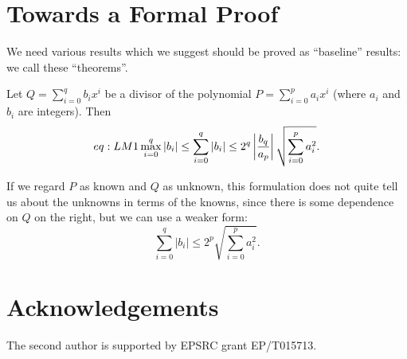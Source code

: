 \documentclass{llncs}
\begin{document}
\section{Towards a Formal Proof}
We need various results which we suggest should be proved as ``baseline'' results: we call these ``theorems''.
\begin{theorem}\label{thm:LM}
Let $Q = \sum_{i=0}^q{b_i x^i}$ be a divisor of the polynomial
$P=\sum_{i=0}^p{a_ix^i}$ (where $a_i$ and $b_i$ are integers). Then
\begin{equation}{eq:LM1}
\max_{i=0}^q\left\vert b_i \right\vert \le
\sum_{i=0}^q \left\vert b_i \right\vert \le
2^q \left\vert b_q \over a_p \right\vert \sqrt{\sum_{i=0}^p{a_i^2}} .
\end{equation}
\end{theorem}
\par
If we regard $P$ as known and $Q$ as unknown, this formulation does not quite
tell us about the unknowns in terms of the knowns, since there is some
dependence on $Q$ on the right, but we can use a weaker form:
\begin{equation}
\sum_{i=0}^q \left\vert b_i \right\vert \le
2^p \sqrt{\sum_{i=0}^p{a_i^2}} .
\end{equation}

\section*{Acknowledgements}The second author is supported by EPSRC grant EP/T015713.

\end{document}
